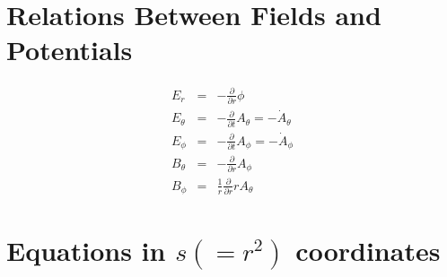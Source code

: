\documentclass[11pt]{article}
\def\ddt{\frac{\partial}{\partial t}}
\def\ddr{\frac{\partial}{\partial r}}
\def\Er{E_r}
\def\Eth{E_\theta}
\def\Eph{E_\phi}
\def\Bth{B_\theta}
\def\Bph{B_\phi}
\def\Athd{\dot{A}_\theta}
\def\Aphd{\dot{A}_\phi}
\def\Ath{A_\theta}
\def\Aph{A_\phi}
\begin{document}
\bigskip

\section{Relations Between Fields and Potentials}
\setcounter{equation}{0}

\begin{eqnarray}
%
%
  \Er &=&
%
  - \ddr \phi
\\[5mm]
%
%
  \Eth &=&
%
  - \ddt \Ath = - \Athd
\\[5mm]
%
%
  \Eph &=&
%
  - \ddt \Aph = - \Aphd
\\[5mm]
%
%
  \Bth &=&
%
  - \ddr \Aph
\\[5mm]
%
%
  \Bph &=&
%
  \frac{1}{r} \ddr r \Ath
\end{eqnarray}

\bigskip

\section{Equations in $s(=r^2)$ coordinates}
\setcounter{equation}{0}
\end{document}
